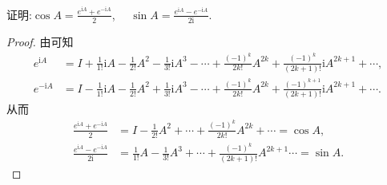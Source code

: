\documentclass[../../main.tex]{subfiles}%
\begin{document}
\begin{theorem}\label{theorem:矩阵三角函数的一般表达式}
证明:$\cos A = \frac{e^{\mathrm{i}A}+e^{-\mathrm{i}A}}{2}$,$\quad$ $\sin A = \frac{e^{\mathrm{i}A}-e^{-\mathrm{i}A}}{2\mathrm{i}}$.
\end{theorem}
\begin{proof}
由可知
\begin{align*}
e^{\mathrm{i}A}&=I+\frac{1}{1!}\mathrm{i}A-\frac{1}{2!}A^2-\frac{1}{3!}\mathrm{i}A^3-\cdots +\frac{\left( -1 \right) ^k}{2k!}A^{2k}+\frac{\left( -1 \right) ^k}{\left( 2k+1 \right) !}\mathrm{i}A^{2k+1}+\cdots,\\
e^{-\mathrm{i}A}&=I-\frac{1}{1!}\mathrm{i}A-\frac{1}{2!}A^2+\frac{1}{3!}\mathrm{i}A^3-\cdots +\frac{\left( -1 \right) ^k}{2k!}A^{2k}+\frac{\left( -1 \right) ^{k+1}}{\left( 2k+1 \right) !}\mathrm{i}A^{2k+1}+\cdots.
\end{align*}
从而
\begin{align*}
\frac{e^{\mathrm{i}A}+e^{-\mathrm{i}A}}{2}&=I-\frac{1}{2!}A^2+\cdots +\frac{\left( -1 \right) ^k}{2k!}A^{2k}+\cdots =\cos A,\\
\frac{e^{\mathrm{i}A}-e^{-\mathrm{i}A}}{2\mathrm{i}}&=\frac{1}{1!}A-\frac{1}{3!}A^3+\cdots +\frac{\left( -1 \right) ^k}{\left( 2k+1 \right) !}A^{2k+1}\cdots =\sin A.
\end{align*}
\end{proof}
\end{document}
